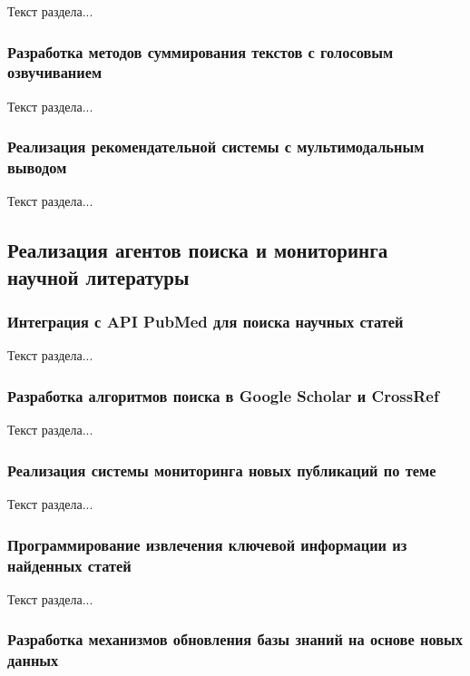 Текст раздела...

\subsubsection{Разработка методов суммирования текстов с голосовым озвучиванием}

Текст раздела...

\subsubsection{Реализация рекомендательной системы с мультимодальным выводом}

Текст раздела...

\subsection{Реализация агентов поиска и мониторинга научной литературы}

\subsubsection{Интеграция с API PubMed для поиска научных статей}

Текст раздела...

\subsubsection{Разработка алгоритмов поиска в Google Scholar и CrossRef}

Текст раздела...

\subsubsection{Реализация системы мониторинга новых публикаций по теме}

Текст раздела...

\subsubsection{Программирование извлечения ключевой информации из найденных статей}

Текст раздела...

\subsubsection{Разработка механизмов обновления базы знаний на основе новых данных}

